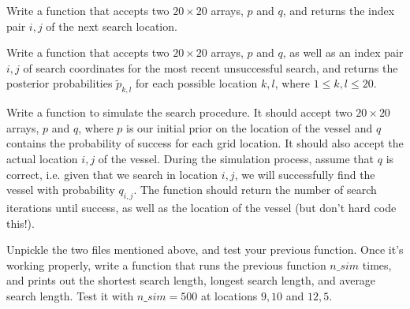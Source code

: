 
Write a function that accepts two $20 \times 20$ arrays, $p$ and $q$, and returns the index pair $i,j$ of the next search location.

Write a function that accepts two $20 \times 20$ arrays, $p$ and $q$, as well as an index pair $i,j$ of search coordinates for the most recent unsuccessful search, and returns the posterior probabilities $\tilde{p}_{k,l}$ for each possible location $k,l$, where $1 \leq k,l \leq 20$.

Write a function to simulate the search procedure. It should accept two $20 \times 20$ arrays, $p$ and $q$, where $p$ is our initial prior on the location of the vessel and $q$ contains the probability of success for each grid location. It should also accept the actual location $i,j$ of the vessel. During the simulation process, assume that $q$ is correct, i.e. given that we search in location $i,j$, we will successfully find the vessel with probability $q_{i,j}$. The function should return the number of search iterations until success, as well as the location of the vessel (but don't hard code this!).

Unpickle the two files mentioned above, and test your previous function. Once it's working properly, write a function that runs the previous function $n\_sim$ times, and prints out the shortest search length, longest search length, and average search length. Test it with $n\_sim = 500$ at locations $9, 10$ and $12, 5$.
